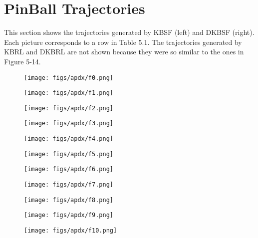 \chapter{PinBall Trajectories}
This section shows the trajectories generated by KBSF (left) and DKBSF (right).
Each picture corresponds to a row in Table 5.1.
The trajectories generated by KBRL and DKBRL are not shown because they
were so similar to the ones in Figure 5-14.

\begin{figure}[!!!ht]
  \centering
    \texttt{[image: figs/apdx/f0.png]}
\end{figure}

\begin{figure}[!!!ht]
  \centering
    \texttt{[image: figs/apdx/f1.png]}
\end{figure}

\begin{figure}[!!!ht]
  \centering
    \texttt{[image: figs/apdx/f2.png]}
\end{figure}

\begin{figure}[!!!ht]
  \centering
    \texttt{[image: figs/apdx/f3.png]}
\end{figure}

\begin{figure}[!!!ht]
  \centering
    \texttt{[image: figs/apdx/f4.png]}
\end{figure}

\begin{figure}[!!!ht]
  \centering
    \texttt{[image: figs/apdx/f5.png]}
\end{figure}

\begin{figure}[!!!ht]
  \centering
    \texttt{[image: figs/apdx/f6.png]}
\end{figure}

\begin{figure}[!!!ht]
  \centering
    \texttt{[image: figs/apdx/f7.png]}
\end{figure}

\begin{figure}[!!!ht]
  \centering
    \texttt{[image: figs/apdx/f8.png]}
\end{figure}

\begin{figure}[!!!ht]
  \centering
    \texttt{[image: figs/apdx/f9.png]}
\end{figure}

\begin{figure}[!!!ht]
  \centering
    \texttt{[image: figs/apdx/f10.png]}
\end{figure}
